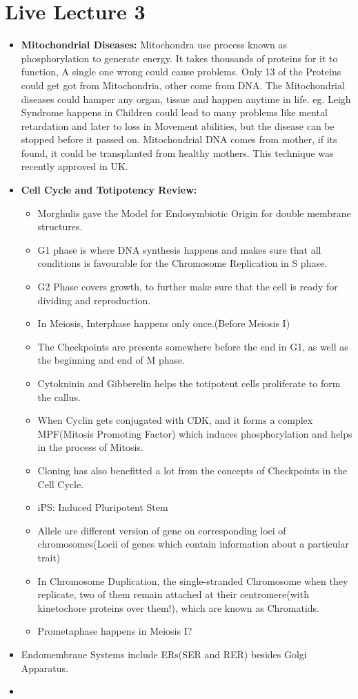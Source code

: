 \documentclass{article}
\begin{document}
\section{Live Lecture 3}
  \begin{itemize}
    \item \textbf{Mitochondrial Diseases:} Mitochondra use process known as phosphorylation to generate energy. It takes thousands of proteins for it to function, A single one wrong could cause problems. Only 13 of the Proteins could get got from Mitochondria, other come from DNA. The Mitochondrial diseases could hamper any organ, tissue and happen anytime in life. eg. Leigh Syndrome happens in Children could lead to many problems like mental retardation and later to loss in Movement abilities, but the disease can be stopped before it passed on. Mitochondrial DNA comes from mother, if its found, it could be transplanted from healthy mothers. This technique was recently approved in UK.
    \item \textbf{Cell Cycle and Totipotency Review:}
    \begin{itemize}
      \item Morghulis gave the Model for Endosymbiotic Origin for double membrane structures.
      \item G1 phase is where DNA synthesis happens and makes sure that all conditions is favourable for the Chromosome Replication in S phase.
      \item G2 Phase covers growth, to further make sure that the cell is ready for dividing and reproduction.
      \item In Meiosis, Interphase happens only once.(Before Meiosis I)
      \item The Checkpoints are presents somewhere before the end in G1, as well as the beginning and end of M phase.
      \item Cytokninin and Gibberelin helps the totipotent cells proliferate to form the callus.
      \item When Cyclin gets conjugated with CDK, and it forms a complex MPF(Mitosis Promoting Factor) which induces phosphorylation and helps in the process of Mitosis.
      \item Cloning has also benefitted a lot from the concepts of Checkpoints in the Cell Cycle.
      \item iPS: Induced Pluripotent Stem
      \item Allele are different version of gene on corresponding loci of chromosomes(Locii of genes which contain information about a particular trait)
      \item In Chromosome Duplication, the single-stranded Chromosome when they replicate, two of them remain attached at their centromere(with kinetochore proteins over them!), which are known as Chromatids.
      \item Prometaphase happens in Meiosis I?
    \end{itemize}
    \item Endomembrane Systems include ERs(SER and RER) besides Golgi Apparatus.
    \item
  \end{itemize}
\end{document}
